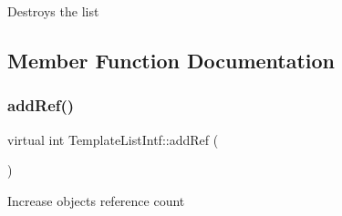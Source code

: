 Destroys the list 

\subsection{Member Function Documentation}
\mbox{\label{class_template_list_intf_a4b4973e2e15396d10bc4e3085462ca2b}} 
\subsubsection{\texorpdfstring{addRef()}{addRef()}}
{\footnotesize\ttfamily virtual int Template\+List\+Intf\+::add\+Ref (\begin{DoxyParamCaption}{ }\end{DoxyParamCaption})\hspace{0.3cm}{\ttfamily [pure virtual]}}

Increase object\textquotesingle{}s reference count 

